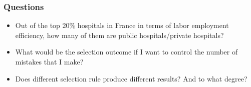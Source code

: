 \documentclass[10pt,mathserif,aspectratio=169]{beamer}
\begin{document}
\begin{frame}
  \frametitle{Questions}
  \begin{itemize}\itemsep=12pt
    \item Out of the top 20\% hospitals in France in terms of labor employment
          efficiency, how many of them are public hospitals/private hospitals?
    \item What would be the selection outcome if I want to control the number of mistakes
          that I make?
    \item Does different selection rule produce different results? And to what degree?
  \end{itemize}
\end{frame}




\end{document}
